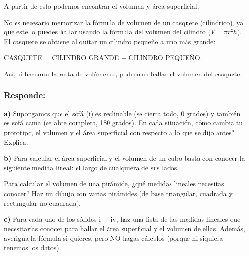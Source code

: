 \documentclass[12pt,a4paper]{article}
\begin{document}
\begin{multicols}{2}
A partir de esto podemos encontrar el volumen y área superficial.

\begin{tcolorbox}[colback=fondorosa, colframe=rojoclaro, breakable]
No es necesario memorizar la fórmula de volumen de un casquete (cilíndrico), ya que este lo puedes hallar usando la fórmula del volumen del cilindro ($V = \pi r^2 h$). El casquete se obtiene al quitar un cilindro pequeño a uno más grande:

CASQUETE = CILINDRO GRANDE $-$ CILINDRO PEQUEÑO.

Así, si hacemos la resta de volúmenes, podremos hallar el volumen del casquete.
\end{tcolorbox}

\subsubsection*{Responde:}

\textbf{a)} Supongamos que el sofá (i) es reclinable (se cierra todo, 0 grados) y también es sofá cama (se abre completo, 180 grados). En cada situación, cómo cambia tu prototipo, el volumen y el área superficial con respecto a lo que se dijo antes? Explica.

\textbf{b)} Para calcular el área superficial y el volumen de un cubo basta con conocer la siguiente medida lineal: el largo de cualquiera de sus lados.

Para calcular el volumen de una pirámide, ¿qué medidas lineales necesitas conocer? Haz un dibujo con varias pirámides (de base triangular, cuadrada y rectangular no cuadrada).

\textbf{c)} Para cada uno de los sólidos i $-$ iv, haz una lista de las medidas lineales que necesitarías conocer para hallar el área superficial y el volumen de ellas. Además, averigua la fórmula si quieres, pero NO hagas cálculos (porque ni siquiera tenemos los datos).

\end{multicols}

\vspace{4mm}

\end{document}
